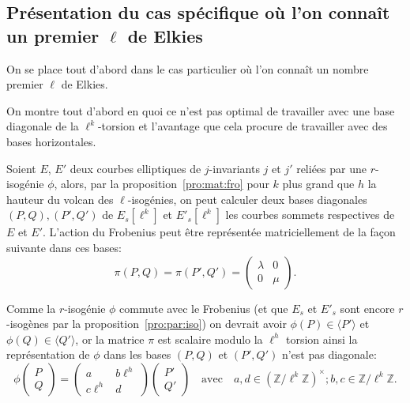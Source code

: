 \documentclass[10pt,a4paper]{book}
\theoremstyle{plain}
\theoremstyle{definition}
\theoremstyle{definition}
\theoremstyle{definition}
\theoremstyle{definition}
\theoremstyle{definition}
\theoremstyle{remark}
\theoremstyle{remark}
\theoremstyle{definition}
\begin{document}
\subsection{Présentation du cas spécifique où l'on connaît un premier $\ell$ de Elkies}
\label{ssec:cou:elk}
On se place tout d'abord dans le cas particulier où l'on connaît un nombre 
premier $\ell$  de Elkies.

On montre tout d'abord en quoi ce n'est pas optimal de travailler avec une base
diagonale de la $\ell^k$-torsion et l'avantage que cela procure de travailler 
avec des bases horizontales.

Soient $E$, $E'$ deux courbes elliptiques de $j$-invariants $j$ et $j'$ reliées par une $r$-isogénie $\phi$, alors, par la proposition~\ref{pro:mat:fro} pour $k$ plus grand que $h$ la hauteur du volcan des $\ell$-isogénies, on peut calculer deux bases diagonales $(P,Q),(P',Q')$ de $E_s[\ell^k]$ et $E'_s[\ell^k]$ les courbes sommets respectives de $E$ et $E'$. L'action du Frobenius peut être représentée matriciellement de  la façon suivante dans ces bases:
\[
\pi(P,Q)=\pi(P',Q')= \left( \begin{matrix}
\lambda & 0 \\
0 & \mu
\end{matrix} \right).
\]

Comme la $r$-isogénie $\phi$ commute avec le Frobenius (et que $E_s$ et $E'_s$ sont encore $r$-isogènes par la proposition~\ref{pro:par:iso}) on devrait avoir $\phi(P) \in \langle P' \rangle $ et $\phi(Q) \in \langle Q' \rangle $, or la matrice $\pi$ est scalaire modulo la $\ell^{h}$ torsion ainsi la représentation de $\phi$ dans les bases $(P,Q)$ et $(P',Q')$ n'est pas diagonale:
\[
\phi \left(
\begin{matrix}
P \\
Q
\end{matrix}
\right)=
\left( 
\begin{matrix}
a &  b\ell^{h} \\
c\ell^{h} & d
\end{matrix}
\right)
\left(
\begin{matrix}
P' \\
Q'
\end{matrix}
\right) \quad \text{avec} \quad a,d \in \left( \mathbb{Z}/\ell^k\mathbb{Z} \right)^{\times}; b,c \in \mathbb{Z}/\ell^{k}\mathbb{Z}.
\]
\end{document}
